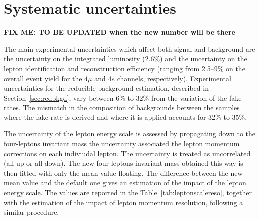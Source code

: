 \section{Systematic uncertainties}
\textbf{FIX ME: TO BE UPDATED when the new number will be there}

The main experimental uncertainties which affect both signal and background are the uncertainty on the integrated luminosity
(2.6\%) and the uncertainty on the lepton identification and reconstruction efficiency (ranging from 2.5--9\% on the 
overall event yield for the $4\mu$ 
and $4e$ channels, respectively). Experimental uncertainties for the reducible background estimation, 
described in Section~\ref{sec:redbkgd},
vary between 6\% to 32\% from the variation of the fake rates. The mismatch in the composition of backgrounds between the samples where the fake rate is derived and where it is applied accounts for 32\% to 35\%.

The uncertainty of the lepton energy scale is assessed by propagating down to the four-leptons invariant mass the uncertainty associated the lepton momentum corrections on each indiviudal lepton. 
The uncertainty is treated as uncorrelated (all up or all down). The new four-leptons invariant mass obtained this way is then fitted with only the mean value floating.
The difference between the new mean value and the default one gives an estimation of the impact of the lepton energy scale. The values are reported in the Table~\ref{tab:leptonscalereso}, together with the estimation of the impact of lepton momentum resolution, following a similar procedure.




